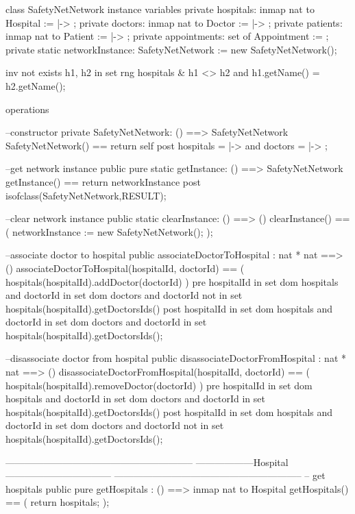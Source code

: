 \begin{vdmpp}[breaklines=true]
class SafetyNetNetwork 
instance variables
  private hospitals: inmap nat to Hospital := { |-> };
  private doctors: inmap nat to Doctor := { |-> };
  private patients: inmap nat to Patient := { |-> };
  private appointments: set of Appointment := {};
  private static networkInstance: SafetyNetNetwork := new SafetyNetNetwork();
  
  inv not exists h1, h2 in set rng hospitals &
  h1 <> h2 and h1.getName() = h2.getName();

operations

  --constructor
  private SafetyNetNetwork: () ==> SafetyNetNetwork
  SafetyNetNetwork() == return self
  post hospitals = { |-> } and  doctors = { |-> };

  --get network instance
  public pure static getInstance: () ==> SafetyNetNetwork
  getInstance() == return networkInstance
  post isofclass(SafetyNetNetwork,RESULT);

  
  --clear network instance
  public static clearInstance: () ==> ()
  clearInstance() == (
   networkInstance := new SafetyNetNetwork(); 
  );
  
  --associate doctor to hospital
  public associateDoctorToHospital : nat * nat ==> ()
   associateDoctorToHospital(hospitalId, doctorId) == (
    hospitals(hospitalId).addDoctor(doctorId)
  )
  pre hospitalId in set dom hospitals and doctorId in set dom doctors and doctorId not in set hospitals(hospitalId).getDoctorsIds()
   post hospitalId in set dom hospitals and doctorId in set dom doctors and doctorId in set hospitals(hospitalId).getDoctorsIds();
    
  
  --disassociate doctor from hospital
  public disassociateDoctorFromHospital : nat * nat ==> ()
   disassociateDoctorFromHospital(hospitalId, doctorId) == (
    hospitals(hospitalId).removeDoctor(doctorId)
  )
  pre hospitalId in set dom hospitals and doctorId in set dom doctors and doctorId in set hospitals(hospitalId).getDoctorsIds()
  post hospitalId in set dom hospitals and doctorId in set dom doctors and doctorId not in set hospitals(hospitalId).getDoctorsIds();
    
  -----------------------------------------------------------
  ------------------Hospital---------------------------------
  -----------------------------------------------------------
   -- get hospitals
  public pure getHospitals : () ==> inmap nat to Hospital
  getHospitals() == (
   return hospitals;
  );
    

\end{vdmpp}
